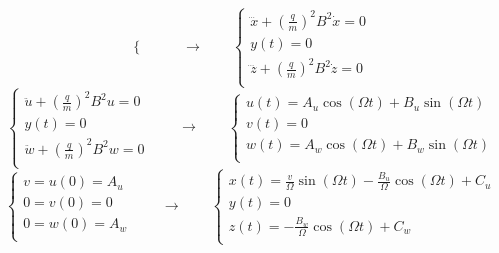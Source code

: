 \begin{itemize}
\begin{itemize}
\begin{equation}
\begin{cases}
            \end{cases} \qquad \rightarrow \qquad
            \begin{cases}
                \dddot{x} + \left(\frac{q}{m}\right)^2 B^2 \dot{x} = 0 \\
                y(t) = 0 \\
                \dddot{z} + \left(\frac{q}{m}\right)^2 B^2 \dot{z} = 0 \\
            \end{cases}
            \end{equation}
            \begin{equation}
            \begin{cases}
                \ddot{u} + \left(\frac{q}{m}\right)^2 B^2 u = 0 \\
                y(t) = 0 \\
                \ddot{w} + \left(\frac{q}{m}\right)^2 B^2 w = 0 \\
            \end{cases} \qquad \rightarrow \qquad
            \begin{cases}
                u(t) = A_u \cos (\Omega t) + B_u \sin (\Omega t) \\
                v(t) = 0 \\
                w(t) = A_w \cos (\Omega t) + B_w \sin (\Omega t) \\
            \end{cases} 
            \end{equation}
            \begin{equation}
            \begin{cases}
                v = u(0) = A_u \\
                0 = v(0) = 0 \\
                0 = w(0) = A_w \\
            \end{cases} \qquad \rightarrow \qquad
            \begin{cases}
                x(t) = \frac{v}{\Omega} \sin (\Omega t) - \frac{B_u}{\Omega} \cos (\Omega t) + C_u \\
                y(t) = 0 \\
                z(t) = - \frac{B_w}{\Omega} \cos (\Omega t) + C_w \\
            \end{cases} 
            \end{equation}
            \begin{equation}

\end{equation}
\end{itemize}
\end{itemize}
